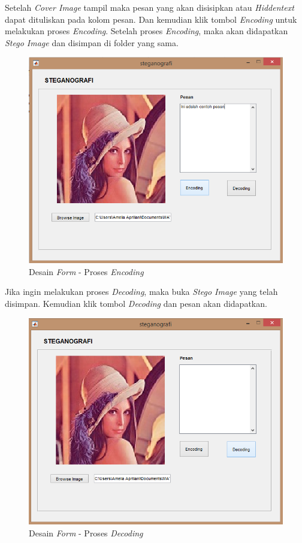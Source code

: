 	Setelah \emph{Cover Image} tampil maka pesan yang akan disisipkan atau \emph{Hiddentext} dapat dituliskan pada kolom pesan. Dan kemudian klik tombol \emph{Encoding} untuk melakukan proses \emph{Encoding}. Setelah proses \emph{Encoding}, maka akan didapatkan \emph{Stego Image} dan disimpan di folder yang sama.
	
	\begin{figure}[H]
		\centering
		\includegraphics[width=1\textwidth]{gambar/mockup/3}
		\caption{Desain \emph{Form} - Proses \emph{Encoding}}
		\label{desain_encoding}
	\end{figure}

	Jika ingin melakukan proses \emph{Decoding}, maka buka \emph{Stego Image} yang telah disimpan. Kemudian klik tombol \emph{Decoding} dan pesan akan didapatkan.
	
	\begin{figure}[H]
		\centering
		\includegraphics[width=1\textwidth]{gambar/mockup/4}
		\caption{Desain \emph{Form} - Proses \emph{Decoding}}
		\label{desain_decoding}
	\end{figure}

